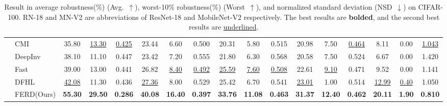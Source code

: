 \begin{table}[t]
{\begin{tabular}{@{}ll ccc ccc ccc ccc ccc!{\vrule width 0pt}@{}}
    & CMI & 35.80 & \underline{13.30} & \underline{0.425} & 23.44 & 6.60 & 0.500 & 20.31 & 5.80 & 0.515 & 20.98 & 7.50 & \underline{0.464} & 8.11 & 0.00 & \underline{1.043} \\
    & DeepInv & 38.10 & 11.10 & 0.447 & 23.42 & 7.20 & 0.555 & 21.80 & 6.30 & 0.568 & 20.58 & 7.50 & 0.524 & 6.67 & 0.00 & 1.420 \\
    & Fast & 39.00 & 13.00 & 0.441 & 26.82 & \underline{8.40} & \underline{0.492} & \underline{25.59} & \underline{7.60} & \underline{0.508} & 22.61 & \underline{9.10} & 0.471 & 9.52 & 0.00 & 1.141 \\
    & DFHL & \underline{42.08} & 11.30 & 0.436 & \underline{27.36} & 8.00 & 0.529 & 25.42 & 6.70 & 0.541 & \underline{23.01} & 1.00 & 0.514 & \underline{12.99} & \underline{0.40} & 1.050 \\
    & FERD(Ours) & \textbf{55.30} & \textbf{29.50} & \textbf{0.286} & \textbf{40.08} & \textbf{16.40} & \textbf{0.397} & \textbf{33.76} & \textbf{11.08} & \textbf{0.463} & \textbf{31.37} & \textbf{12.40} & \textbf{0.462} & \textbf{20.11} & \textbf{1.90} & \textbf{0.810} \\
    \bottomrule
  \end{tabular}%
  }
  \caption{Result in average robustness(\%) (Avg.~$\uparrow$), worst-10\% robustness(\%) (Worst~$\uparrow$), and normalized standard deviation (NSD~$\downarrow$) on CIFAR-100. RN-18 and MN-V2 are abbreviations of ResNet-18 and MobileNet-V2 respectively. The best results are \textbf{bolded}, and the second best results are \underline{underlined}.}
  \label{tab2:cifar100_results}
\end{table}

